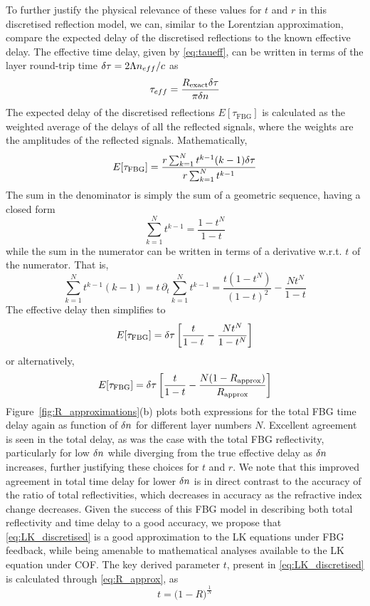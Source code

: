 %
To further justify the physical relevance of these values for $t$ and $r$ in this discretised reflection model, we can, similar to the Lorentzian approximation, 
compare the expected delay of the discretised reflections to the known effective delay. 
The effective time delay, given by \eqref{eq:taueff}, can be written in terms of the layer round-trip time $\delta \tau = 2 \Lambda n_{eff}/c$ as
%
\begin{equation}
    \tau_{eff} = \frac{R_\text{exact} \delta \tau}{\pi \delta n}
\end{equation}
%
The expected delay of the discretised reflections $E[\tau_\text{FBG}]$ is calculated as the weighted average of the delays of all the reflected signals, where the weights are the amplitudes of the reflected signals. 
Mathematically,
%
\begin{equation*}
    E[\tau_\text{FBG}] = \frac{r \sum_{k=1}^{N} t^{k-1} (k-1)\delta \tau}{r \sum_{k=1}^{N} t^{k-1}}
\end{equation*}
%
The sum in the denominator is simply the sum of a geometric sequence, having a closed form
%
\begin{equation*}
    \sum_{k=1}^{N} t^{k-1} = \frac{1-t^N}{1-t}
\end{equation*}
%
while the sum in the numerator can be written in terms of a derivative w.r.t. $t$ of the numerator. That is,
%
\begin{equation*}
    \sum_{k=1}^{N} t^{k-1} (k-1) = t \, \partial_t \sum_{k=1}^{N} t^{k-1} = \frac{t(1-t^N)}{(1-t)^2} - \frac{N t^N}{1-t}
\end{equation*}
%
The effective delay then simplifies to
%
\begin{equation*}
    E[\tau_\text{FBG}] = \delta \tau\left[ \frac{t}{1-t} - \frac{N t^N}{1-t^N} \right]
\end{equation*}
%
or alternatively,
%
\begin{equation*}
    E[\tau_\text{FBG}] = \delta \tau\left[ \frac{t}{1-t} - \frac{N (1-R_\text{approx})}{ R_\text{approx}} \right]
\end{equation*}
%
Figure~\ref{fig:R_approximations}(b) plots both expressions for the total FBG time delay again as function of $\delta n$ for different layer numbers $N$. 
Excellent agreement is seen in the total delay, as was the case with the total FBG reflectivity, 
particularly for low $\delta n$ while diverging from the true effective delay as $\delta n$ increases, further justifying these choices for $t$ and $r$. 
We note that this improved agreement in total time delay for lower $\delta n$ is in direct contrast to the accuracy of the ratio of total reflectivities, which decreases in accuracy as the refractive index change decreases. 
Given the success of this FBG model in describing both total reflectivity and time delay to a good accuracy, we propose that \eqref{eq:LK_discretised} is a good approximation to the LK equations under FBG feedback, 
while being amenable to mathematical analyses available to the LK equation under COF. 
The key derived parameter $t$, present in \eqref{eq:LK_discretised} is calculated through \eqref{eq:R_approx}, as
%
\begin{equation}
\label{eq:discretised_t}
    t =  \big( 1-R \big) ^\frac{1}{N}
\end{equation}
%
%
